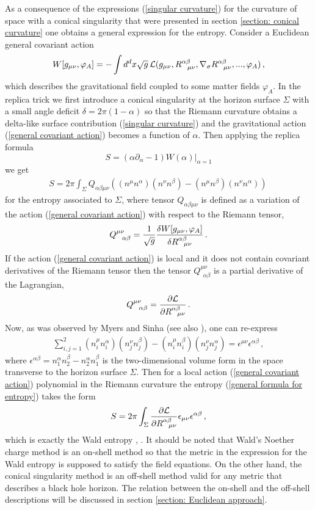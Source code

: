 \documentclass[12pt]{article}
\def\be{\begin{eqnarray}}
\def\ee{\end{eqnarray}}
\def\lb{\label}
\def\o{\over}
\begin{document}
As a consequence of the expressions (\ref{singular curvature}) for the curvature of space with a conical singularity 
that were presented in section \ref{section: conical curvature} one obtains a general expression for the entropy. Consider a Euclidean general covariant action  
\be
W[g_{\mu\nu}, \varphi_A]=-\int d^d x\sqrt{g}\, {\cal L}(g_{\mu\nu}, R^{\alpha\beta}_{\ \ \mu\nu}, \nabla_\sigma R^{\alpha\beta}_{\ \ \mu\nu}, ..., \varphi_A)\, ,
\lb{general covariant action}
\ee
which describes the gravitational field coupled to some matter fields $\varphi_A$. In the replica trick we first introduce a conical singularity at the horizon surface $\Sigma$ with a small angle deficit
$\delta=2\pi(1-\alpha)$ so that the Riemann curvature obtains a delta-like surface contribution (\ref{singular curvature}) and the gravitational action (\ref{general covariant action})
becomes a function of $\alpha$. Then applying the replica formula 
$$S=(\alpha\partial_\alpha-1)W(\alpha)|_{\alpha=1}$$
 we get 
\be
S=2\pi\int_\Sigma Q_{\alpha\beta\mu\nu}\left((n^\mu n^\alpha)(n^\nu n^\beta)-(n^\mu n^\beta)(n^\nu n^\alpha)\right)\, 
\lb{general formula for entropy}
\ee
for  the entropy associated to  $\Sigma$, where tensor $Q_{\alpha\beta\mu\nu}$ is defined as  a  variation of the action (\ref{general covariant action}) with respect to the Riemann tensor,
\be
Q^{\mu\nu}_{\ \ \alpha\beta}={1\o \sqrt{g}}{\delta W[g_{\mu\nu}, \varphi_A]\o \delta R^{\alpha\beta}_{\ \ \mu\nu}}\, .
\lb{tensor Q}
\ee
If the action (\ref{general covariant action}) is local and it does not contain covariant derivatives of the Riemann tensor then  the tensor $Q^{\mu\nu}_{\ \ \alpha\beta}$
is a partial derivative of the Lagrangian, 
\be
Q^{\mu\nu}_{\ \ \alpha\beta}={\partial {\cal L}\o \partial R^{\alpha\beta}_{\ \ \mu\nu}}\, .
\lb{tensor Q-2}
\ee
Now, as was observed by Myers and Sinha \cite{Myers:2010tj}  (see also \cite{Azeyanagi:2007bj}), one can re-express 
\be
\sum_{i,j=1}^2(n_i^\mu n_i^\alpha)(n_j^\nu n_j^\beta)-(n_i^\mu n_i^\beta)(n_j^\nu n_j^\alpha)=\epsilon^{\mu\nu}\epsilon^{\alpha\beta}\, ,
\lb{re-expression}
\ee
where $\epsilon^{\alpha\beta}=n_1^\alpha n_2^\beta-n_2^\alpha n_1^\beta$ is the two-dimensional volume form in the space transverse to the horizon surface $\Sigma$.
Then for a local action (\ref{general covariant action}) polynomial in the Riemann curvature the entropy (\ref{general formula for entropy}) takes the form
\be
S=2\pi \int_\Sigma {\partial {\cal L}\o \partial R^{\alpha\beta}_{\ \ \mu\nu}} \epsilon_{\mu\nu}\epsilon^{\alpha\beta}\, ,
\lb{Wald's entropy-0}
\ee
which is exactly the Wald entropy  \cite{Wald:1993nt}, \cite{Jacobson:1993vj}. It should be noted that Wald's Noether charge method is an on-shell method so that the metric in 
the expression for the Wald entropy  is supposed to satisfy the field equations. On the other hand,  the conical singularity method is an off-shell method  valid for any metric that describes a black hole horizon. The relation between the on-shell and the off-shell descriptions will be discussed in section \ref{section: Euclidean approach}.
\end{document}

